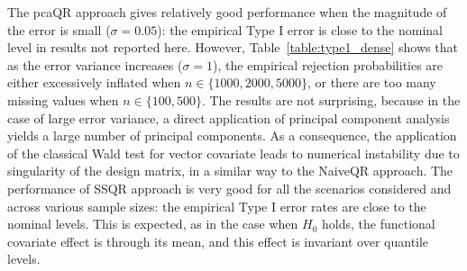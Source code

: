 \documentclass[times,sort&compress,3p]{elsarticle}
\theoremstyle{plain}%
\theoremstyle{definition}
\begin{document}
The pcaQR approach gives relatively good performance when the magnitude of the error is small ($\sigma=0.05$): the empirical Type I error is close to the nominal level in results not reported here. However, Table~\ref{table:type1_dense} shows that as the error variance increases ($\sigma=1$), the empirical rejection probabilities are either excessively inflated when $n \in \{1000, 2000, 5000\}$, or there are too many missing values when $n \in \{100, 500\}$. The results are not surprising, because in the case of large error variance, a direct application of principal component analysis yields a large number of principal components. As a consequence, the application of the classical Wald test for vector covariate leads to numerical instability due to singularity of the design matrix, in a similar way to the NaiveQR approach. The performance of SSQR approach is very good for all the scenarios considered and across various sample sizes: the empirical Type I error rates are close to the nominal levels. This is expected, as in the case when $H_0$ holds, the functional covariate effect is through its mean, and this effect is invariant over quantile levels.
\end{document}
